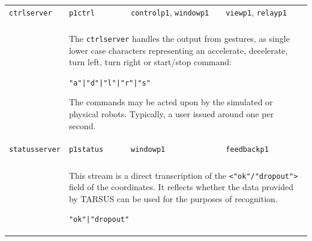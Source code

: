 \documentclass[12pt,a4,notitlepage]{report}
\renewcommand{\_}{\texttt{\symbol{95}}}
\newcommand{\<}{\texttt{\symbol{60}}}
\renewcommand{\>}{\texttt{\symbol{62}}}
\newcommand{\scopendpoint}[1]{\texttt{#1}}
\newcommand{\variable}[1]{\texttt{#1}}
\begin{document}
\begin{tabular}{l|p{2.5cm}p{4.5cm}p{4.5cm}}
\hline
\rule{0mm}{4.5mm}\variable{ctrlserver} & \scopendpoint{p1ctrl} &
\scopendpoint{controlp1}, \scopendpoint{windowp1} &
\scopendpoint{viewp1}, \scopendpoint{relayp1}\rule[-2mm]{0mm}{3mm}\\ \\

 & \multicolumn{3}{l}{\begin{minipage}{12.5cm}%
The \variable{ctrlserver} handles the output from gestures, as single lower case characters representing an accelerate, decelerate, turn left, turn right or start/stop command:

\texttt{\<"a"|"d"|"l"|"r"|"s"\>}

The commands may be acted upon by the simulated or physical robots. Typically, a user issued around one per second.\rule[-2mm]{0mm}{3mm}
\end{minipage}}\\

\hline
\rule{0mm}{4.5mm}\variable{statusserver} & \scopendpoint{p1status} &
\scopendpoint{windowp1} & \scopendpoint{feedbackp1}\rule[-2mm]{0mm}{3mm}\\ \\

 & \multicolumn{3}{l}{\begin{minipage}{12.5cm}%
This stream is a direct transcription of the \texttt{<"ok"/"dropout">} field of the coordinates. It reflects whether the data provided by TARSUS can be used for the purposes of recognition.

\texttt{\<"ok"|"dropout"\>}
\end{minipage}}\\
\end{tabular}
\end{document}
